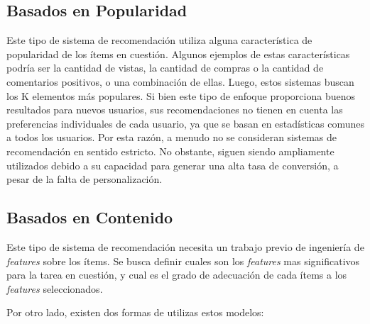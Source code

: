 \documentclass[11pt,a4paper,twoside]{thesis}
\begin{document}
\subsection{Basados en Popularidad}

Este tipo de sistema de recomendación utiliza alguna característica de
popularidad de los ítems en cuestión. Algunos ejemplos de estas características
podría ser la cantidad de vistas, la cantidad de compras o la cantidad de
comentarios positivos, o una combinación de ellas. Luego, estos sistemas buscan
los K elementos más populares. Si bien este tipo de enfoque proporciona buenos
resultados para nuevos usuarios, sus recomendaciones no tienen en cuenta las
preferencias individuales de cada usuario, ya que se basan en estadísticas
comunes a todos los usuarios. Por esta razón, a menudo no se consideran
sistemas de recomendación en sentido estricto. No obstante, siguen siendo
ampliamente utilizados debido a su capacidad para generar una alta tasa de
conversión, a pesar de la falta de personalización.

\subsection{Basados en Contenido}

Este tipo de sistema de recomendación \cite{viedma2016introduccion,
	glauber2019collaborative} necesita un trabajo previo de ingeniería de
\textit{features} sobre los ítems. Se busca definir cuales son los
\textit{features} mas significativos para la tarea en cuestión, y cual es el
grado de adecuación de cada ítems a los \textit{features} seleccionados.

Por otro lado, existen dos formas de utilizas estos modelos:
\end{document}
